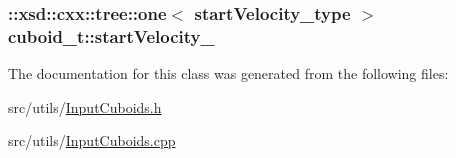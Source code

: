 \hypertarget{classcuboid__t_a0720684b94609a0c60088e2535cc2c67}{
\subsubsection[{start\-Velocity\-\_\-}]{\setlength{\rightskip}{0pt plus 5cm}\-::xsd\-::cxx\-::tree\-::one$<$ {\bf start\-Velocity\-\_\-type} $>$ cuboid\-\_\-t\-::start\-Velocity\-\_\-\hspace{0.3cm}{\ttfamily [protected]}}}\label{classcuboid__t_a0720684b94609a0c60088e2535cc2c67}


The documentation for this class was generated from the following files\-:\begin{DoxyCompactItemize}
\item 
src/utils/\hyperlink{InputCuboids_8h}{Input\-Cuboids.\-h}\item 
src/utils/\hyperlink{InputCuboids_8cpp}{Input\-Cuboids.\-cpp}\end{DoxyCompactItemize}
